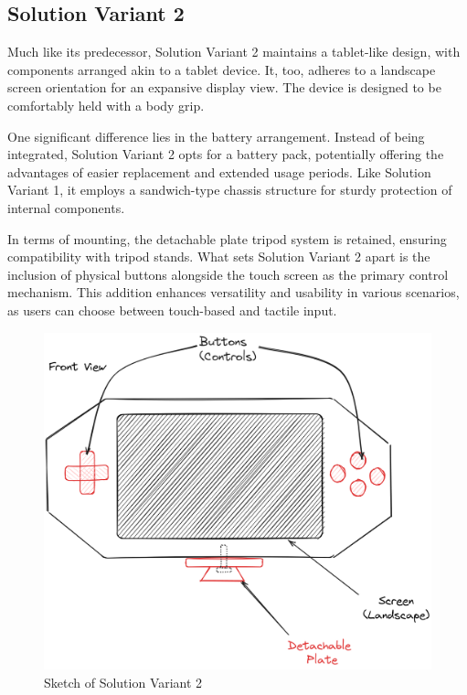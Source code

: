 \subsection{Solution Variant 2}
Much like its predecessor, Solution Variant 2 maintains a tablet-like design, with components arranged akin to a tablet device. It, too, adheres to a landscape screen orientation for an expansive display view. The device is designed to be comfortably held with a body grip.

One significant difference lies in the battery arrangement. Instead of being integrated, Solution Variant 2 opts for a battery pack, potentially offering the advantages of easier replacement and extended usage periods. Like Solution Variant 1, it employs a sandwich-type chassis structure for sturdy protection of internal components.

In terms of mounting, the detachable plate tripod system is retained, ensuring compatibility with tripod stands. What sets Solution Variant 2 apart is the inclusion of physical buttons alongside the touch screen as the primary control mechanism. This addition enhances versatility and usability in various scenarios, as users can choose between touch-based and tactile input.

\begin{figure}[H]
    \centering
    \includegraphics[width=\linewidth]{texs/Part1/chapter3/image/v2.png}
    \caption{Sketch of Solution Variant 2}
    \label{fig:sketch-solution-variant-2}
\end{figure}

